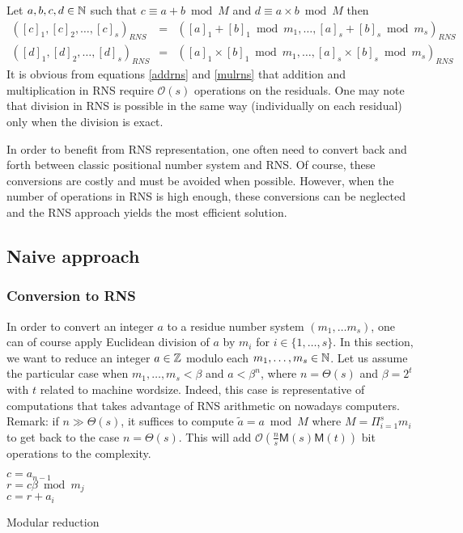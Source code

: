 \documentclass[acmtoms,acmnow]{acmtrans2m}
\def\M{\mathsf{M}} \def\I{\mathsf{I}} \def\R{\mathsf{R}} \def\Q{\mathbb{Q}}
\def\bigO{{\ensuremath{\mathcal{O}}}}
\begin{document}
Let $a,b,c,d \in \mathbb{N}$ such that $c\equiv a + b \bmod M$ and $d \equiv a \times b
\bmod M$ then
\begin{eqnarray}
([c]_1,[c]_2,\dots,[c]_s)_{RNS} &=& ([a]_1+[b]_1 \bmod m_1,\dots, [a]_s+[b]_s \bmod
  m_s)_{RNS} \label{addrns}\\ ([d]_1,[d]_2,\dots,[d]_s)_{RNS} &=& ([a]_1\times [b]_1 \bmod
  m_1,\dots, [a]_s\times [b]_s \bmod m_s)_{RNS} \label{mulrns}
\end{eqnarray}
It is obvious from equations \ref{addrns} and \ref{mulrns} that addition and
multiplication in RNS require $\bigO(s)$ operations on the residuals. One may
note that division in RNS is possible in the same way (individually on each
residual) only when the division is exact.

In order to benefit from RNS representation, one often need to convert back and
forth between classic positional number system and RNS. Of course, these
conversions are costly and must be avoided when possible. However, when the
number of operations in RNS is high enough, these conversions can be neglected
and the RNS approach yields the most efficient solution.

\subsection{Naive approach}

\subsubsection{Conversion to RNS}\label{sssec:naivetoRNS}
In order to convert an integer $a$ to a residue number system
$(m_1,\hdots m_s)$, one can of course apply Euclidean division of $a$ by $m_i$
for $i\in \{1,\hdots,s\}$. In this section, we want to reduce an integer
$a\in\mathbb{Z}$ modulo each $m_1,\dots,m_s\in\mathbb{N}$. Let us assume the particular case
when $m_1,\dots,m_s<\beta$ and $a<\beta^n$, where $n=\Theta(s)$ and $\beta=2^t$ with $t$ related to machine wordsize. 
Indeed, this case is representative of computations that takes advantage of RNS arithmetic on nowadays computers.
Remark: if $n\gg\Theta(s)$, it suffices to compute $\tilde{a}=a \bmod M$ where $M=\Pi_{i=1}^s m_i$ to get back to the case $n=\Theta(s)$. This will add $\bigO(\frac{n}{s}\M(s)\M(t))$ bit
operations to the complexity.
\smallskip

\begin{algorithm}[H]
{} 
$c=a_{n-1}$\\  { $r=c\beta \bmod
  m_j$\\ $c=r+a_i$\\ } \;
\caption{Modular reduction}\label{alg:modred}
\end{algorithm}
 
\end{document}
